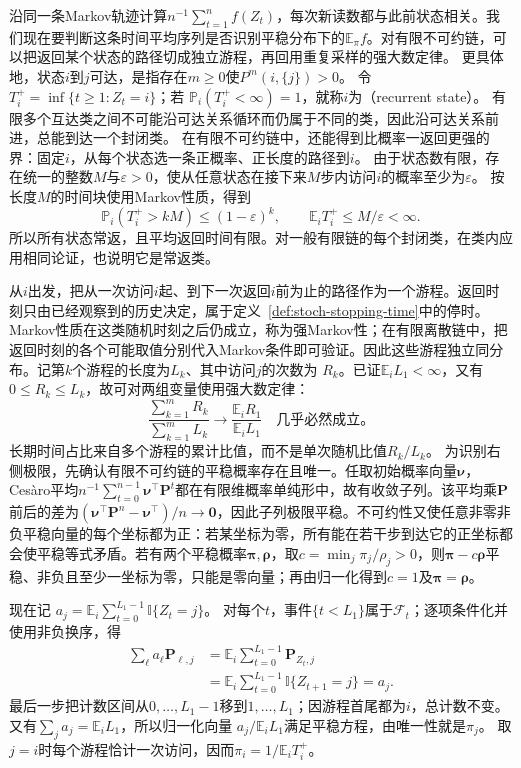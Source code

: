 沿同一条Markov轨迹计算\(n^{-1}\sum_{t=1}^n f(Z_t)\)，每次新读数都与此前状态相关。我们现在要判断这条时间平均序列是否识别平稳分布下的\(\mathbb E_\pi f\)。对有限不可约链，可以把返回某个状态的路径切成独立游程，再回用重复采样的强大数定律。
更具体地，状态\(i\)到\(j\)可达，是指存在\(m\geq0\)使\(P^m(i,\{j\})>0\)。
令\(T_i^+=\inf\{t\geq1:Z_t=i\}\)；若
$\mathbb{P}_i(T_i^+<\infty)=1$，就称$i$为（recurrent state）。
有限多个互达类之间不可能沿可达关系循环而仍属于不同的类，因此沿可达关系前进，总能到达一个封闭类。
在有限不可约链中，还能得到比概率一返回更强的界：固定$i$，从每个状态选一条正概率、正长度的路径到$i$。
由于状态数有限，存在统一的整数$M$与$\varepsilon>0$，使从任意状态在接下来$M$步内访问$i$的概率至少为$\varepsilon$。
按长度$M$的时间块使用Markov性质，得到
\[
 \mathbb P_i(T_i^+>kM)\leq(1-\varepsilon)^k,\qquad
 \mathbb E_iT_i^+\leq M/\varepsilon<\infty.
\]
所以所有状态常返，且平均返回时间有限。对一般有限链的每个封闭类，在类内应用相同论证，也说明它是常返类。

从$i$出发，把从一次访问$i$起、到下一次返回$i$前为止的路径作为一个游程。返回时刻只由已经观察到的历史决定，属于定义~\ref{def:stoch-stopping-time}中的停时。Markov性质在这类随机时刻之后仍成立，称为强Markov性；在有限离散链中，把返回时刻的各个可能取值分别代入Markov条件即可验证。因此这些游程独立同分布。记第$k$个游程的长度为$L_k$、其中访问$j$的次数为
$R_k$。已证$\mathbb E_iL_1<\infty$，又有$0\leq R_k\leq L_k$，故可对两组变量使用强大数定律：
\[
  \frac{\sum_{k=1}^{m}R_k}{\sum_{k=1}^{m}L_k}
  \longrightarrow
  \frac{\mathbb{E}_iR_1}{\mathbb{E}_iL_1}
  \quad\text{几乎必然成立。}
\]
长期时间占比来自多个游程的累计比值，而不是单次随机比值$R_k/L_k$。
为识别右侧极限，先确认有限不可约链的平稳概率存在且唯一。任取初始概率向量\(\bm\nu\)，Ces\`aro平均\(n^{-1}\sum_{t=0}^{n-1}\bm\nu^{\top}\bm P^t\)都在有限维概率单纯形中，故有收敛子列。该平均乘\(\bm P\)前后的差为\((\bm\nu^{\top}\bm P^n-\bm\nu^{\top})/n\to\bm0\)，因此子列极限平稳。不可约性又使任意非零非负平稳向量的每个坐标都为正：若某坐标为零，所有能在若干步到达它的正坐标都会使平稳等式矛盾。若有两个平稳概率\(\bm\pi,\bm\rho\)，取\(c=\min_j\pi_j/\rho_j>0\)，则\(\bm\pi-c\bm\rho\)平稳、非负且至少一坐标为零，只能是零向量；再由归一化得到\(c=1\)及\(\bm\pi=\bm\rho\)。

现在记
$a_j=\mathbb E_i\sum_{t=0}^{L_1-1}\mathbb I\{Z_t=j\}$。
对每个$t$，事件$\{t<L_1\}$属于$\mathcal F_t$；逐项条件化并使用非负换序，得
\[
\begin{aligned}
 \sum_\ell a_\ell\bm P_{\ell,j}
 &=\mathbb E_i\sum_{t=0}^{L_1-1}\bm P_{Z_t,j}\\
 &=\mathbb E_i\sum_{t=0}^{L_1-1}\mathbb I\{Z_{t+1}=j\}
 =a_j.
\end{aligned}
\]
最后一步把计数区间从$0,\ldots,L_1-1$移到$1,\ldots,L_1$；因游程首尾都为$i$，总计数不变。
又有$\sum_j a_j=\mathbb E_iL_1$，所以归一化向量
$a_j/\mathbb E_iL_1$满足平稳方程，由唯一性就是$\pi_j$。
取$j=i$时每个游程恰计一次访问，因而$\pi_i=1/\mathbb E_iT_i^+$。

